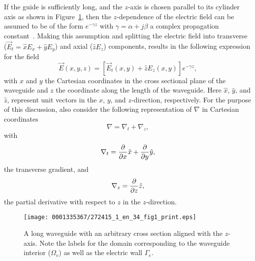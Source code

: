 If the guide is sufficiently long, and the $z$-axis is chosen parallel
to its cylinder axis as shown in
Figure~\ref{fig:lezar:long_waveguide}, then the $z$-dependence of the
electric field can be assumed to be of the form $e^{-\gamma z}$ with
$\gamma = \alpha + j\beta$ a complex propagation constant~\citep{PelosiCoccioliSelleri1998,
Pozar2005}. Making this assumption and splitting the electric field
into transverse ($\vec{E}_t = \hat{x}E_x + \hat{y}E_y$) and axial
($\hat{z}E_z$) components, results in the following expression for the
field
\begin{equation}
    \label{eq:lezar:field_components}
    \vec{E}(x,y,z) = [\vec{E}_t(x,y) + \hat{z}E_z(x,y)]e^{-\gamma z},
\end{equation}
with $x$ and $y$ the Cartesian coordinates in the cross sectional
plane of the waveguide and $z$ the coordinate along the length of the
waveguide. Here $\hat{x}$, $\hat{y}$, and $\hat{z}$, represent unit
vectors in the $x$, $y$, and $z$-direction, respectively. For the
purpose of this discussion, also consider the following representation
of $\nabla$ in Cartesian coordinates
\begin{equation}
  \label{eq:lezar:nabla_components}
  \nabla = \nabla_t + \nabla_z,
\end{equation}
with\vspace*{6pt}
\begin{equation}
\nabla_t = \frac{\partial}{\partial x}\hat{x} + \frac{\partial}{\partial y}\hat{y},\vspace*{1.5pt}
\end{equation}
the transverse gradient, and\vspace*{6pt}
\begin{equation}
\nabla_z = \frac{\partial}{\partial z}\hat{z},\vspace*{2pt}
\end{equation}
the partial derivative with respect to $z$ in the $z$-direction.

\begin{figure}[!t]
\centering
\texttt{[image: 0001335367/272415\_1\_en\_34\_fig1\_print.eps]}
 \caption{A long waveguide with an arbitrary cross section aligned
 with the $z$-axis. Note the labels for the domain corresponding to the
 waveguide interior ($\Omega_v$) as well as the electric wall $\Gamma_e$.}
 \label{fig:lezar:long_waveguide}
\end{figure}


